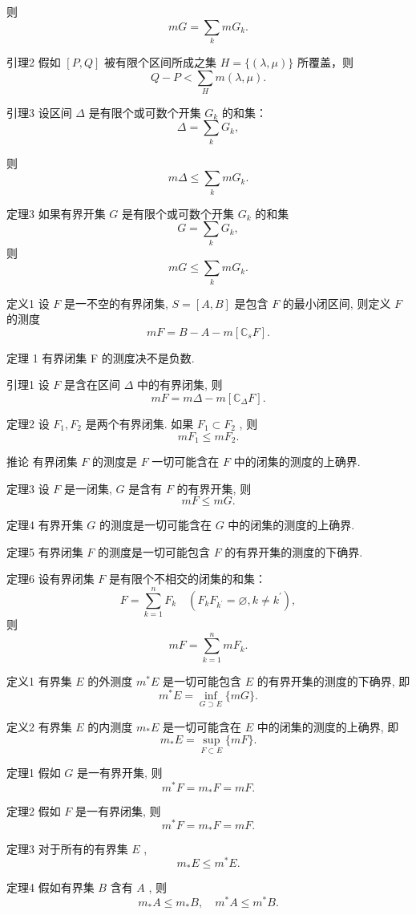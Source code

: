 \documentclass[]{article}
\begin{document}
则 $$
m G = \sum_ {k} m G _ {k}.
$$

引理2 假如 $[P, Q]$ 被有限个区间所成之集 $H = \{(\lambda, \mu)\}$ 所覆盖，则 $$
Q - P <   \sum_ {H} m (\lambda , \mu).
$$

引理3 设区间 $\Delta$ 是有限个或可数个开集 $G_{k}$ 的和集：$$
\Delta = \sum_ {k} G _ {k},
$$

则$$
m \Delta \leqslant \sum_ {k} m G _ {k}.
$$

定理3 如果有界开集 $G$ 是有限个或可数个开集 $G_{k}$ 的和集$$
G = \sum_ {k} G _ {k},
$$则 $$
m G \leqslant \sum_ {k} m G _ {k}.
$$

定义1 设 $F$ 是一不空的有界闭集, $S = [A, B]$ 是包含 $F$ 的最小闭区间, 则定义 $F$ 的测度 $$
m F = B - A - m [ \mathbb {C} _ {s} F ].
$$

定理 1 有界闭集 F 的测度决不是负数. 

引理1 设 $F$ 是含在区间 $\Delta$ 中的有界闭集, 则  $$
m F = m \Delta - m [ \mathbb {C} _ {\Delta} F ].
$$

定理2 设 $F_{1}, F_{2}$ 是两个有界闭集. 如果 $F_{1} \subset F_{2}$ , 则 $$
m F _ {1} \leqslant m F _ {2}.
$$

推论 有界闭集 $F$ 的测度是 $F$ 一切可能含在 $F$ 中的闭集的测度的上确界. 

定理3 设 $F$ 是一闭集, $G$ 是含有 $F$ 的有界开集, 则$$
m F \leqslant m G.
$$

定理4 有界开集 $G$ 的测度是一切可能含在 $G$ 中的闭集的测度的上确界. 

定理5 有界闭集 $F$ 的测度是一切可能包含 $F$ 的有界开集的测度的下确界. 

定理6 设有界闭集 $F$ 是有限个不相交的闭集的和集：$$
F = \sum_ {k = 1} ^ {n} F _ {k} \quad (F _ {k} F _ {k ^ {\prime}} = \varnothing , k \neq k ^ {\prime}),
$$ 则  $$
m F = \sum_ {k = 1} ^ {n} m F _ {k}.
$$

定义1 有界集 $E$ 的外测度 $m^{*}E$ 是一切可能包含 $E$ 的有界开集的测度的下确界, 即 $$
m ^ {*} E = \inf _ {G \supset E} \{m G \}.
$$

定义2 有界集 $E$ 的内测度 $m_{*}E$ 是一切可能含在 $E$ 中的闭集的测度的上确界, 即 $$
m _ {*} E = \sup _ {F \subset E} \{m F \}.
$$

定理1 假如 $G$ 是一有界开集, 则$$
m ^ {*} F = m _ {*} F = m F.
$$

定理2 假如 $F$ 是一有界闭集, 则$$
m ^ {*} F = m _ {*} F = m F.
$$

定理3 对于所有的有界集 $E$ , $$
m _ {*} E \leqslant m ^ {*} E.
$$

定理4 假如有界集 $B$ 含有 $A$ , 则   $$
m _ {*} A \leqslant m _ {*} B, \quad m ^ {*} A \leqslant m ^ {*} B.
$$
\end{document}
